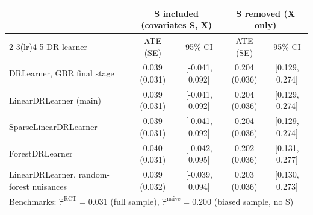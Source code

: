 \begin{tabular}{lcccc}
\toprule
 & \multicolumn{2}{c}{S included (covariates S, X)} & \multicolumn{2}{c}{S removed (X only)} \\
\cmidrule(lr){2-3}\cmidrule(lr){4-5}
DR learner & ATE (SE) & 95\% CI & ATE (SE) & 95\% CI \\
\midrule
DRLearner, GBR final stage & 0.039 (0.031) & [-0.041, 0.092] & 0.204 (0.036) & [0.129, 0.274] \\
LinearDRLearner (main) & 0.039 (0.031) & [-0.041, 0.092] & 0.204 (0.036) & [0.129, 0.274] \\
SparseLinearDRLearner & 0.039 (0.031) & [-0.041, 0.092] & 0.204 (0.036) & [0.129, 0.274] \\
ForestDRLearner & 0.040 (0.031) & [-0.042, 0.095] & 0.202 (0.036) & [0.131, 0.277] \\
LinearDRLearner, random-forest nuisances & 0.039 (0.032) & [-0.039, 0.094] & 0.203 (0.036) & [0.130, 0.273] \\
\midrule
\multicolumn{5}{l}{Benchmarks: $\hat\tau^{\,\mathrm{RCT}}=0.031$ (full sample), $\hat\tau^{\,\mathrm{naive}}=0.200$ (biased sample, no S)} \\
\bottomrule
\end{tabular}
